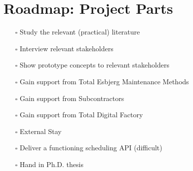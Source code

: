 \begin{minipage}[t]{0.46\textwidth}
\section*{Roadmap: Project Parts}
\begin{itemize}
	\item[\rlap{\raisebox{0.3ex}{\hspace{0.4ex}\tiny \ding{52}}}$\square$] Study the relevant (practical) literature
	\item[\rlap{\raisebox{0.3ex}{\hspace{0.4ex}\tiny \ding{52}}}$\square$] Interview relevant stakeholders
	\item[\rlap{\raisebox{0.3ex}{\hspace{0.4ex}\tiny \ding{52}}}$\square$] Show prototype concepts to relevant stakeholders
	\item[\rlap{\raisebox{0.3ex}{\hspace{0.4ex}\tiny \ding{52}}}$\square$] Gain support from Total Esbjerg Maintenance Methods
	\item[\rlap{\raisebox{0.3ex}{\hspace{0.4ex}\tiny \ding{52}}}$\square$] Gain support from Subcontractors
	\item[\rlap{\raisebox{0.3ex}{\hspace{0.4ex}\tiny \ding{52}}}$\square$] Gain support from Total Digital Factory
	\item[$\square$] External Stay
	\item[$\square$] Deliver a functioning scheduling API (difficult)
	\item[$\square$] Hand in Ph.D. thesis
\end{itemize}

\end{minipage}
